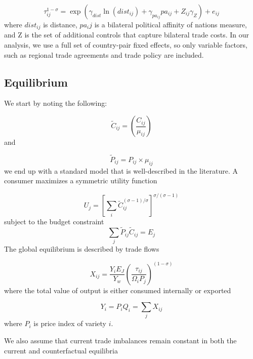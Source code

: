  \begin{equation}
 \label{eq:tcost}
    \tau^{1-\sigma}_{ij}=\exp(\gamma_{dist} \ln(dist_{ij})+\gamma_{pa_{ij}} pa_{ij}+Z_{ij} \gamma_Z) +e_{ij}
 \end{equation}
where $dist_{ij}$ is distance, $pa_ij$ is a bilateral political affinity of nations measure, and Z is the set of additional controls that capture bilateral trade costs. In our analysis, we use a full set of country-pair fixed effects, so only variable factors, such as regional trade agreements and trade policy are included.
 
 \subsection{Equilibrium}
 
 We start by noting the following:
 
 \begin{equation}
     \tilde{C}_{ij}= \left( \frac{C_{ij}}{\mu_{ij}} \right)
 \end{equation}
 and
 
 \begin{equation}
     \tilde{P}_{ij}=P_{ij} \times \mu_{ij}
 \end{equation}
 we end up with a standard model that is well-described in the literature. A consumer maximizes a symmetric utility function
 
 \begin{equation}
\label{eq:utility1}
    U_j=\left[ \sum_{i} \tilde{C}_{ij}^{(\sigma-1)/\sigma} \right]^{\sigma/(\sigma-1)}
\end{equation}
subject to the budget constraint
\begin{equation}
\label{eq:budget1}
\sum_{j}\tilde{P}_{ij}\tilde{C}_{ij}=E_{j}
\end{equation}
The global equilibrium is described by trade flows
 
 \begin{equation}
 \label{eq:export}
 X_{ij}=\frac{Y_i E_J}{Y_w} \left ( \frac{\tau_{ij}}{\Omega_i P_j} \right )^{(1-\sigma)}
 \end{equation}
where the total value of output is either consumed internally or exported
 
 \begin{equation}
     \label{eq:gdp}
     Y_i=P_iQ_i=\sum_{j}X_{ij}
 \end{equation}
where $P_i$ is price index of variety $i$.
 
We also assume that current trade imbalances remain constant in both the current and counterfactual equilibria

